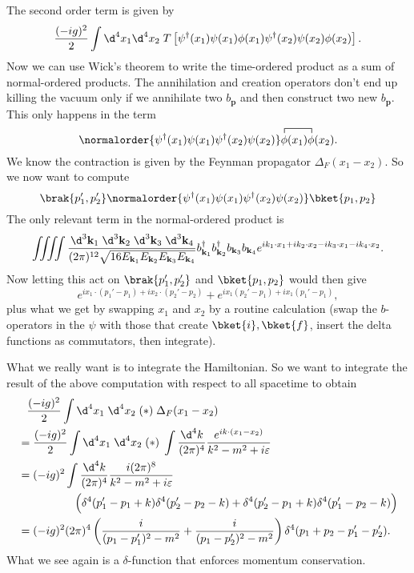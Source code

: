 \documentclass[a4paper]{article}
\begin{document}
\begin{eg}
  The second order term is given by
  \[
    \frac{(-ig)^2}{2}\int \d^4 x_1 \d^4 x_2 \; T\left[\psi^\dagger(x_1) \psi(x_1) \phi(x_1) \psi^\dagger(x_2) \psi(x_2) \phi(x_2)\right].
  \]
  Now we can use Wick's theorem to write the time-ordered product as a sum of normal-ordered products. The annihilation and creation operators don't end up killing the vacuum only if we annihilate two $b_\mathbf{p}$ and then construct two new $b_\mathbf{p}$. This only happens in the term
  \[
    \normalorder{\psi^\dagger(x_1) \psi(x_1) \psi^\dagger(x_2) \psi(x_2)} \contraction{}{\phi}{(x_1)}{\phi}\phi(x_1)\phi(x_2).
  \]
  We know the contraction is given by the Feynman propagator $\Delta_F(x_1 - x_2)$. So we now want to compute
  \[
    \brak{p_1', p_2'} \normalorder{\psi^\dagger(x_1) \psi(x_1) \psi^\dagger(x_2) \psi(x_2)}\bket{p_1, p_2}
  \]
  The only relevant term in the normal-ordered product is
  \[
    \iiiint \frac{\d^3 \mathbf{k}_1\;\d^3 \mathbf{k}_2 \;\d^3 \mathbf{k}_3 \;\d^3 \mathbf{k}_4}{(2\pi)^{12}\sqrt{16 E_{\mathbf{k}_1} E_{\mathbf{k}_2} E_{\mathbf{k}_3} E_{\mathbf{k}_4}}} b_{\mathbf{k}_1}^\dagger b_{\mathbf{k}_2}^\dagger b_{\mathbf{k}_3} b_{\mathbf{k}_4} e^{ik_1 \cdot x_1 + i k_2 \cdot x_2 - i k_3 \cdot x_1 - i k_4 \cdot x_2}.
  \]
  Now letting this act on $\brak{p_1', p_2'}$ and $\bket{p_1, p_2}$ would then give
  \[
    e^{ix_1 \cdot (p_1' - p_1) + i x_2 \cdot (p_2' - p_2)} + e^{ix_1(p_2' - p_1) + i x_1 (p_1' - p_1)}, \tag{$*$}
  \]
  plus what we get by swapping $x_1$ and $x_2$ by a routine calculation (swap the $b$-operators in the $\psi$ with those that create $\bket{i}, \bket{f}$, insert the delta functions as commutators, then integrate).

  What we really want is to integrate the Hamiltonian. So we want to integrate the result of the above computation with respect to all spacetime to obtain
  \begin{align*}
    &\hphantom{=}\frac{(-ig)^2}{2} \int \d^4 x_1\;\d^4 x_2 \;(*)\; \Delta_F(x_1 - x_2)\\
    &= \frac{(-ig)^2}{2}\int \d^4 x_1\;\d^4 x_2 \;(*)\; \int \frac{\d^4 k}{(2\pi)^4} \frac{e^{ik\cdot(x_1 - x_2)}}{k^2 - m^2 + i \varepsilon}\\
    &=(-ig)^2 \int \frac{\d^4 k}{(2\pi)^4} \frac{i (2\pi)^8}{k^2 - m^2 + i \varepsilon} \\
    &\hphantom{=(-ig)^2 \int}\Big(\delta^4(p_1' - p_1 + k) \delta^4(p_2' - p_2 - k) + \delta^4(p_2' - p_1 + k) \delta^4(p_1' - p_2 - k)\Big)\\
    &= (-ig)^2 (2\pi)^4\left(\frac{i}{(p_1 - p_1')^2 - m^2} + \frac{i}{(p_1 - p_2')^2 - m^2}\right) \delta^4(p_1 + p_2 - p_1' - p_2').
  \end{align*}
  What we see again is a $\delta$-function that enforces momentum conservation.
\end{eg}
\end{document}
